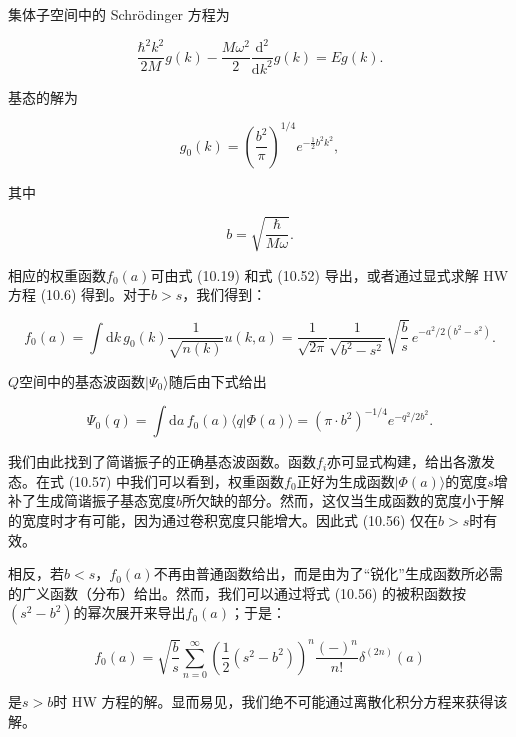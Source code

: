 集体子空间中的 Schrödinger 方程为

\begin{equation}
\frac{\hbar^{2}k^{2}}{2M}g(k)-\frac{M\omega^{2}}{2}\frac{\mathrm{d}^{2}}{\mathrm{d}k^{2}}g(k)=Eg(k).\label{eq:ho_schrodinger_k_space}
\end{equation}

基态的解为

\begin{equation}
g_{0}(k)=\left(\frac{b^{2}}{\pi}\right)^{1/4}e^{-\frac{1}{2}b^{2}k^{2}},\label{eq:ho_ground_state_gk}
\end{equation}

其中

\[
b=\sqrt{\frac{\hbar}{M\omega}}.
\]

相应的权重函数$f_{0}(a)$可由式 (10.19) 和式 (10.52) 导出，或者通过显式求解 HW 方程 (10.6)
得到。对于$b>s$，我们得到：

\begin{equation}
f_{0}(a)=\int\mathrm{d}k\,g_{0}(k)\frac{1}{\sqrt{n(k)}}u(k,a)=\frac{1}{\sqrt{2\pi}}\frac{1}{\sqrt{b^{2}-s^{2}}}\sqrt{\frac{b}{s}}\,e^{-a^{2}/2(b^{2}-s^{2})}.\label{eq:ho_weight_func_f0}
\end{equation}

$Q$空间中的基态波函数$|\Psi_{0}\rangle$随后由下式给出

\begin{equation}
\Psi_{0}(q)=\int\mathrm{d}a\,f_{0}(a)\langle q|\Phi(a)\rangle=(\pi\cdot b^{2})^{-1/4}e^{-q^{2}/2b^{2}}.\label{eq:ho_ground_state_psi0}
\end{equation}

我们由此找到了简谐振子的正确基态波函数。函数$f_{i}$亦可显式构建，给出各激发态。在式 (10.57) 中我们可以看到，权重函数$f_{0}$正好为生成函数$|\Phi(a)\rangle$的宽度$s$增补了生成简谐振子基态宽度$b$所欠缺的部分。然而，这仅当生成函数的宽度小于解的宽度时才有可能，因为通过卷积宽度只能增大。因此式
(10.56) 仅在$b>s$时有效。

相反，若$b<s$，$f_{0}(a)$不再由普通函数给出，而是由为了“锐化”生成函数所必需的广义函数（分布）给出。然而，我们可以通过将式
(10.56) 的被积函数按$(s^{2}-b^{2})$的幂次展开来导出$f_{0}(a)$；于是：

\begin{equation}
f_{0}(a)=\sqrt{\frac{b}{s}}\sum^{\infty}_{n=0}\left(\frac{1}{2}(s^{2}-b^{2})\right)^{n}\frac{(-)^{n}}{n!}\delta^{(2n)}(a)\label{eq:ho_weight_function_distribution_series}
\end{equation}

是$s>b$时 HW 方程的解。显而易见，我们绝不可能通过离散化积分方程来获得该解。


